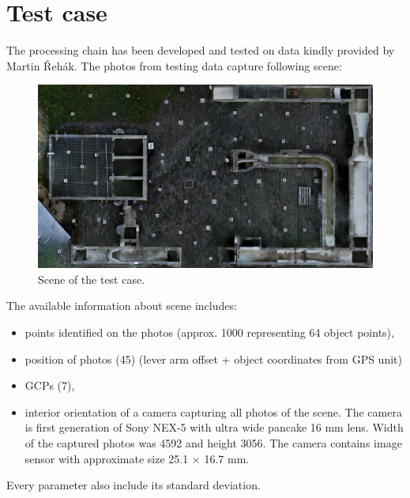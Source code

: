 \documentclass[a4paper,12pt]{article}
\begin{document}

\section{Test case}
\label{sec:test_case}

The processing chain has been developed and tested on data kindly provided by Martin Řehák. 
The photos from testing data capture following scene:

\begin{center}
 \begin{figure}[!h]
    \includegraphics[scale=0.4]{figures/calib_field.png}
    \caption{Scene of the test case.}
    \label{fig:test_case}
\end{figure}
\end{center}


The available information about scene includes:

\begin{itemize}
\item points identified on the photos (approx. 1000 representing 64 object points),
\item position of photos (45) (lever arm offset + object coordinates from GPS unit) 
\item GCPs (7),
\item interior orientation of a camera capturing all photos of the scene.
The camera is first generation of Sony NEX-5 with ultra wide pancake 16 mm lens.
Width of the captured photos was 4592 and height 3056.
The camera contains image sensor with approximate size 25.1 × 16.7 mm.
\end{itemize}
Every parameter also include its standard deviation. 

\end{document}
